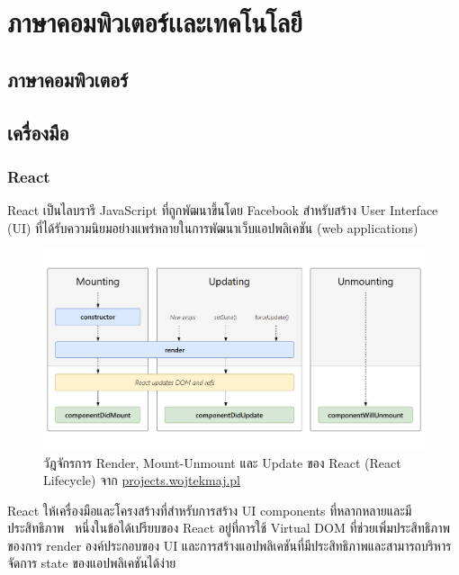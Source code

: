 \documentclass[12pt,oneside,openright,a4paper]{cpe-thai-project}
\begin{document}
\pagebreak
\section{ภาษาคอมพิวเตอร์เเละเทคโนโลยี}
    \subsection{ภาษาคอมพิวเตอร์}
    
    \subsection{เครื่องมือ}
        \subsubsection{React}
            \begin{flushleft}
                React เป็นไลบรารี JavaScript ที่ถูกพัฒนาขึ้นโดย Facebook สำหรับสร้าง User Interface (UI) ที่ได้รับความนิยมอย่างแพร่หลายในการพัฒนาเว็บแอปพลิเคชัน (web applications)~\cite{flanagan20js}
            \end{flushleft}
            \begin{figure}[H]
                \centering
                \includegraphics[width=12cm]{figure/literature/react-lifecycle.png}
                \caption[วัฏจักรการทำงานของ React]{วัฎจักรการ Render, Mount-Unmount และ Update ของ React (React Lifecycle) จาก \href{https://projects.wojtekmaj.pl/react-lifecycle-methods-diagram/}{projects.wojtekmaj.pl} }\label{fig:lit-react}
            \end{figure}
            \begin{flushleft}
                React ให้เครื่องมือและโครงสร้างที่สำหรับการสร้าง UI components ที่หลากหลายและมีประสิทธิภาพ~\cite{crockford08js} หนึ่งในข้อได้เปรียบของ React อยู่ที่การใช้ Virtual DOM ที่ช่วยเพิ่มประสิทธิภาพของการ render องค์ประกอบของ UI และการสร้างแอปพลิเคชันที่มีประสิทธิภาพและสามารถบริหารจัดการ state ของแอปพลิเคชันได้ง่าย~\cite{flanagan20js}
            \end{flushleft}
\end{document}
